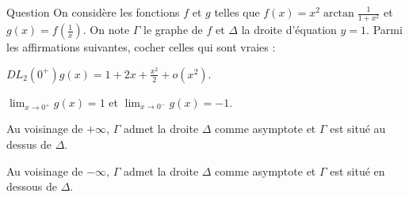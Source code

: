 \begin{multi}[multiple,feedback=
{On a : \(\displaystyle g(x)=\frac{1}{x^2}\arctan \frac{x^2}{1+x^2}\). On vérifie que \(\displaystyle DL_4(0)\arctan u=u-\frac{u^3}{3}+o(u^4)\) et donc avec \(\displaystyle u=\frac{x^2}{1+x^2}=x^2-x^4+o(x^4)\), on obtient :
\[DL_2(0)g(x)=1-x^2+o(x^2) \Rightarrow DL_2(\pm\infty)f(x)=1-\frac{1}{x^2}+o\left(\frac{1}{x^2}\right).\]
Ainsi, au voisinage de \(\pm\infty\), \(\Gamma\) admet \(\Delta\) comme asymptote et \(\Gamma\) est situé en dessous de \(\Delta\) car \(\displaystyle f(x)-y=-\frac{1}{x^2}+o\left(\frac{1}{x^2}\right)\leq 0\). Enfin, \(\displaystyle \lim _{x\to 0^+}g(x)=\lim _{x\to 0^-}g(x)=1\).
}]{Question}
On considère les fonctions \(f\) et \(g\) telles que \(\displaystyle f(x)=x^2\arctan \frac{1}{1+x^2}\) et \(\displaystyle g(x)=f\left(\frac{1}{x}\right)\). On note \(\Gamma\) le graphe de \(f\) et \(\Delta\) la droite d'équation \(\displaystyle y=1\). Parmi les affirmations suivantes, cocher celles qui sont vraies :

    \item* \(\displaystyle DL_2(0^+)g(x)=1+2x+\frac{x^2}{2}+o(x^2)\).
    \item \(\displaystyle \lim _{x\to 0^+}g(x)=1\) et \(\displaystyle \lim _{x\to 0^-}g(x)=-1\).
    \item Au voisinage de \(+\infty\), \(\Gamma\) admet la droite \(\Delta\) comme asymptote et \(\Gamma\) est situé au dessus de \(\Delta\).
    \item* Au voisinage de \(-\infty\), \(\Gamma\) admet la droite \(\Delta\) comme asymptote et \(\Gamma\) est situé en dessous de \(\Delta\).
\end{multi}


